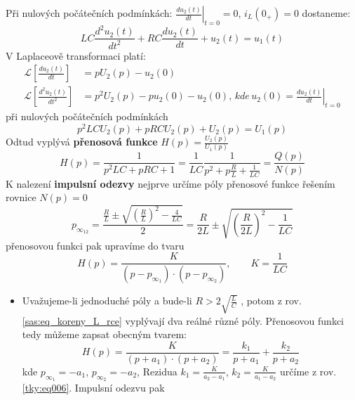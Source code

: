 \begin{example}
  Při nulových počátečních podmínkách: $\left.\frac{du_2(t)}{dt}\right\rvert_{t=0}=0$, $i_L(0_+)=0$ dostaneme:
  \begin{equation}\label{sas:eq_dif_RLC_II_r}
    LC\frac{d^2u_2(t)}{dt^2}+RC\frac{du_2(t)}{dt}+u_2(t)=u_1(t)
  \end{equation}
  V Laplaceově transformaci platí:
  \begin{align*}
    \mathcal{L}\left[\frac{du_2(t)}{dt}\right]     &= pU_2(p)-u_2(0) \\
    \mathcal{L}\left[\frac{d^2u_2(t)}{dt^2}\right] &= p^2U_2(p)-pu_2(0)-u_2(0),\,kde\,u_2(0)=
    \left.\frac{du_2(t)}{dt}\right\rvert_{t=0}
  \end{align*}
  při nulových počátečních podmínkách
  \begin{equation}\label{sas:eq_L_RLC_rce}
    p^2LCU_2(p)+pRCU_2(p)+U_2(p)=U_1(p)
  \end{equation}
  Odtud vyplývá \textbf{přenosová funkce} $H(p)=\frac{U_2(p)}{U_1(p)}$
  \begin{equation}\label{sas:eq_Hp_RLC}
    H(p)=\frac{1}{p^2LC+pRC+1}
        =\frac{1}{LC}\frac{1}{p^2+p\frac{R}{L}+\frac{1}{LC}}=\frac{Q(p)}{N(p)}
  \end{equation}
  K nalezení \textbf{impulsní odezvy} nejprve určíme póly přenosové funkce řešením rovnice
  $N(p)=0$
  \begin{equation}\label{sas:eq_koreny_L_rce}
    p_{\infty_{12}}=\frac{\frac{R}{L}\pm\sqrt{\left(\frac{R}{L}\right)^2-\frac{4}{LC}}}{2}
    =\frac{R}{2L}\pm\sqrt{\left(\frac{R}{2L}\right)^2-\frac{1}{LC}}
  \end{equation}
  přenosovou funkci pak upravíme do tvaru
  \begin{equation}\label{sas:eq_Hp_forma}
    H(p)=\frac{K}{(p-p_{\infty_1})\cdot(p-p_{\infty_2})}, \qquad K=\frac{1}{LC}
  \end{equation}
  \begin{itemize}
    \item Uvažujeme-li jednoduché póly a bude-li $R>2\sqrt{\frac{L}{C}}$ , potom z  rov.
          \ref{sas:eq_koreny_L_rce} vyplývají dva reálné různé póly. Přenosovou funkci tedy můžeme
          zapsat obecným tvarem:
          \begin{equation}\label{sas:eq_Hp_forma_2}
            H(p)=\frac{K}{(p+a_1)\cdot(p+a_2)}=\frac{k_1}{p+a_1}+\frac{k_2}{p+a_2}
          \end{equation}
          kde $p_{\infty_1}=-a_1,\, p_{\infty_2}=-a_2$, Rezidua  $k_1=\frac{K}{a_2-a_1}$,
          $k_2=\frac{K}{a_1-a_2}$ určíme z rov. \ref{tky:eq006}. Impulsní odezvu pak

\end{itemize}
\end{example}

